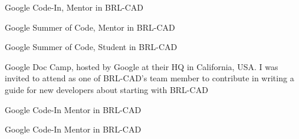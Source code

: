    {Google Code-In,}
    {}
    {Mentor in BRL-CAD}
    {}
    {}

    {Google Summer of Code,}
    {}
    {Mentor in BRL-CAD}
    {}
    {}

    {Google Summer of Code,}
    {}
    {Student in BRL-CAD}
    {}
    {}

    {Google Doc Camp,}
    {}
    {hosted by Google at their HQ in California, USA. I was invited to attend as one of BRL-CAD's team member to contribute in writing a guide for new developers about starting with BRL-CAD}
    {}
    {}

    {Google Code-In}
    {}
    {Mentor in BRL-CAD}
    {}
    {}

    {Google Code-In}
    {}
    {Mentor in BRL-CAD}
    {}
    {}
